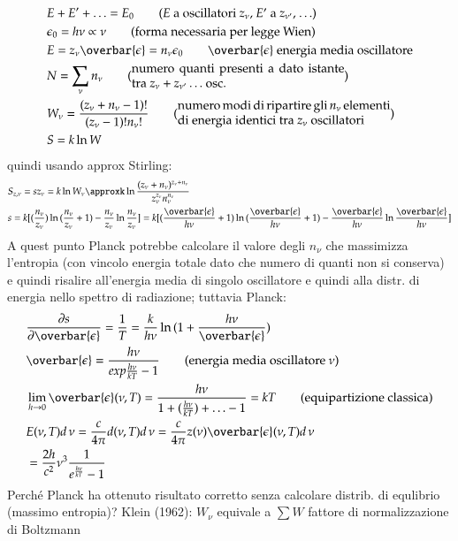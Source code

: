                 \begin{align*}
                    &E+E'+\ldots=E_0\tag{$E$ a oscillatori $z_{\nu}$, $E'$ a $z_{\nu'}$, $\ldots$}\\
                    &\epsilon_0=h\nu\propto\nu\tag{forma necessaria per legge Wien}\\
                    &E=z_{\nu}\overbar{\epsilon}=n_{\nu}\epsilon_0\tag*{$\overbar{\epsilon}$ energia media oscillatore}\\
                    &N=\sum_{\nu}n_{\nu}\tag{\begin{minipage}{0.5\textwidth}numero quanti presenti a dato istante  tra $z_{\nu}+z_{\nu'}\ldots$ osc.\end{minipage}}\\
                    &W_{\nu}=\frac{(z_{\nu}+n_{\nu}-1)!}{(z_{\nu}-1)!n_{\nu}!}\tag{\begin{minipage}{0.5\textwidth}numero modi di ripartire gli $n_{\nu}$ elementi di energia identici tra $z_{\nu}$ oscillatori\end{minipage}}\\
                    &S=k\ln{W}
                \end{align*}
                quindi usando approx Stirling:
                \begin{align*}
                    &S_{z,\nu}=sz_{\nu}=k\ln{W_{\nu}}\approxk\ln{\frac{(z_{\nu}+n_{\nu})^{z_{\nu}+n_{\nu}}}{z_{\nu}^{z_{\nu}}n_{\nu}^{n_{\nu}}}}\\
                    &s=k[(\frac{n_{\nu}}{z_{\nu}})\ln{(\frac{n_{\nu}}{z_{\nu}}+1)}-\frac{n_{\nu}}{z_{\nu}}\ln{\frac{n_{\nu}}{z_{\nu}}}]=k[(\frac{\overbar{\epsilon}}{h\nu}+1)\ln{(\frac{\overbar{\epsilon}}{h\nu}+1)}-\frac{\overbar{\epsilon}}{h\nu}\ln{\frac{\overbar{\epsilon}}{h\nu}}]
                \end{align*}
                A quest punto Planck potrebbe calcolare il valore degli $n_{\nu}$ che massimizza l'entropia (con vincolo energia totale dato che numero di quanti non si conserva) e quindi risalire all'energia media di singolo oscillatore e quindi alla distr. di energia nello spettro di radiazione; tuttavia Planck:
                \begin{align*}
                    &\PDy{\overbar{\epsilon}}{s}=\frac{1}{T}=\frac{k}{h\nu}\ln{(1+\frac{h\nu}{\overbar{\epsilon}})}\\
                    &\overbar{\epsilon}=\frac{h\nu}{exp{\frac{h\nu}{kT}}-1}\tag{energia media oscillatore $\nu$}\\
                    &\lim_{h\to0}\overbar{\epsilon}(\nu,T)=\frac{h\nu}{1+(\frac{h\nu}{kT})+\ldots-1}=kT\tag{equipartizione classica}\\
                    &E(\nu,T)d\,\nu=\frac{c}{4\pi}d(\nu,T)d\,\nu=\frac{c}{4\pi}z(\nu)\overbar{\epsilon}(\nu,T)d\,\nu\\
                    &=\frac{2h}{c^2}\nu^3 \frac{1}{\exp{\frac{h\nu}{kT}}-1}
                \end{align*}
                Perch\'e Planck ha ottenuto risultato corretto senza calcolare distrib. di equlibrio (massimo entropia)? Klein (1962): $W_{\nu}$ equivale a $\sum W$ fattore di normalizzazione di Boltzmann
